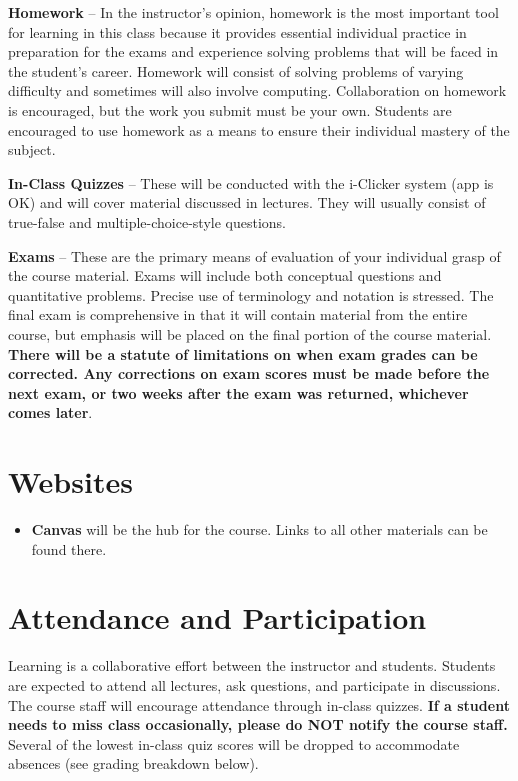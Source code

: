 \documentclass[9pt]{article}
\begin{document}
\textbf{Homework} -- In the instructor's opinion, homework is the most important tool for learning in this class because it provides essential individual practice in preparation for the exams and experience solving problems that will be faced in the student's career. Homework will consist of
solving problems of varying difficulty and sometimes will also involve
computing. Collaboration on homework is encouraged, but the work you submit must be your own. Students are encouraged to use homework as a means to ensure
their individual mastery of the subject.

\textbf{In-Class Quizzes} -- These will be conducted with the i-Clicker system (app is OK) and will cover material discussed in
lectures.  They will usually consist of true-false and multiple-choice-style questions.

\textbf{Exams} -- These are the primary means of evaluation of your
individual grasp of the course material. Exams will include both conceptual questions and
quantitative problems. Precise use of terminology and notation is
stressed. The final exam is comprehensive in that it will contain
material from the entire course, but emphasis will be placed on the
final portion of the course material. \textbf{There will
be a statute of limitations on when exam grades can be corrected. Any
corrections on exam scores must be made before the next exam, or two
weeks after the exam was returned, whichever comes later}.

\section*{Websites}

\begin{itemize}[nosep]
    \item \textbf{Canvas} will be the hub for the course. Links to all other materials can be found there.
\end{itemize}

\section*{Attendance and Participation}

Learning is a collaborative effort between the instructor and students. Students are expected to attend all lectures, ask questions, and participate in discussions. The course staff will encourage attendance through in-class quizzes. \textbf{If a student needs to miss class occasionally, please do NOT notify the course staff.} Several of the lowest in-class quiz scores will be dropped to accommodate absences (see grading breakdown below).
\end{document}
